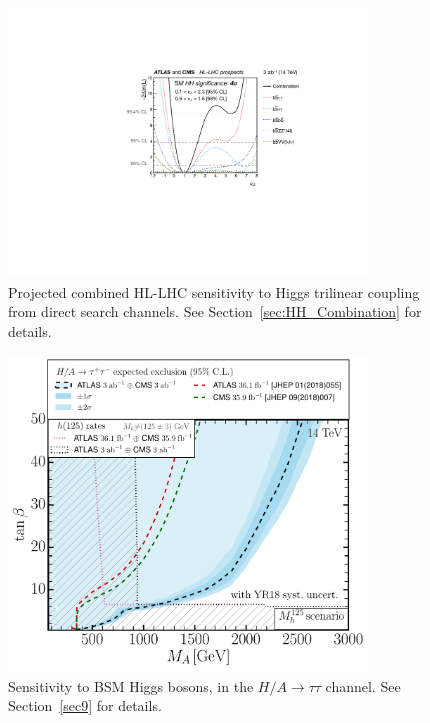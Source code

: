 \documentclass[../report.tex]{subfiles}
\begin{document}
\begin{figure}[t!]
\begin{center}
 \includegraphics[width=0.85\textwidth]{section10/img/HH.pdf}
 \caption{Projected combined HL-LHC sensitivity to Higgs trilinear coupling from direct search channels. See Section~\ref{sec:HH_Combination} for details.
\label{fig:HiggsHH}
}
  \end{center}
\end{figure}

\begin{figure}[t!]
\begin{center} 
\includegraphics[width=0.85\textwidth]{section10/img/BSM.pdf}
\caption{Sensitivity to BSM Higgs bosons, in the $H/A\to\tau\tau$ channel. See Section~\ref{sec9} for details.
\label{fig:HiggsBSM}
 }
  \end{center}
\end{figure}
\end{document}
